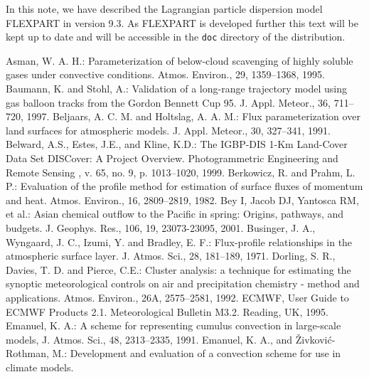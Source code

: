 \documentclass{egu}                  %
\begin{document}
In this note, we have described the Lagrangian particle dispersion model FLEXPART in version
9.3.  As FLEXPART is developed further this text will be kept up to date and will be accessible 
in the \texttt{doc} directory of the distribution. 

\begin{thebibliography}{}

Asman, W. A. H.:
Parameterization of below-cloud scavenging of highly soluble gases under convective conditions.
Atmos. Environ., 29, 1359--1368, 1995.
Baumann, K. and Stohl, A.:
Validation of a long-range trajectory model using gas balloon tracks from the Gordon Bennett Cup 95.
J. Appl. Meteor., 36, 711--720, 1997.
Beljaars, A. C. M. and Holtslag, A. A. M.:
Flux parameterization over land surfaces for atmospheric models.
J. Appl. Meteor., 30, 327--341, 1991.
Belward, A.S., Estes, J.E., and Kline, K.D.: 
The IGBP-DIS 1-Km Land-Cover Data Set DISCover: A Project Overview. 
Photogrammetric Engineering and Remote Sensing , v. 65, no. 9, p. 1013--1020, 1999.
Berkowicz, R. and Prahm, L. P.:
Evaluation of the profile method for estimation of surface fluxes of momentum and heat.
Atmos. Environ., 16, 2809--2819, 1982.
Bey I, Jacob DJ, Yantosca RM, et al.:
Asian chemical outflow to the Pacific in spring: Origins, pathways, and budgets.
J. Geophys. Res., 106, 19, 23073-23095, 2001.
Businger, J. A., Wyngaard, J. C., Izumi, Y. and Bradley, E. F.:
Flux-profile relationships in the atmospheric surface layer.
J. Atmos. Sci., 28, 181--189, 1971. 
 Dorling, S. R., Davies, T. D. and Pierce, C.E.:
Cluster analysis: a technique for estimating the synoptic meteorological controls on air and precipitation chemistry - method and applications.
Atmos. Environ., 26A, 2575--2581, 1992.
ECMWF,
User Guide to ECMWF Products 2.1. Meteorological Bulletin M3.2. Reading, UK, 1995.
Emanuel, K. A.:
A scheme for representing cumulus convection in large-scale models,
J. Atmos. Sci., 48, 2313--2335, 1991.
Emanuel, K. A., and \v{Z}ivkovi\'{c}-Rothman, M.:
Development and evaluation of a convection scheme for use in climate models.

\end{thebibliography}
\end{document}
